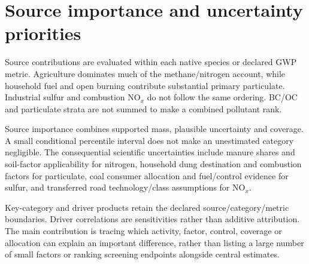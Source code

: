 \section{Source importance and uncertainty priorities}\label{sec:keycat}
Source contributions are evaluated within each native species or declared GWP metric. Agriculture dominates much of the methane/nitrogen account, while household fuel and open burning contribute substantial primary particulate. Industrial sulfur and combustion NO$_x$ do not follow the same ordering. BC/OC and particulate strata are not summed to make a combined pollutant rank.

Source importance combines supported mass, plausible uncertainty and coverage. A small conditional percentile interval does not make an unestimated category negligible. The consequential scientific uncertainties include manure shares and soil-factor applicability for nitrogen, household dung destination and combustion factors for particulate, coal consumer allocation and fuel/control evidence for sulfur, and transferred road technology/class assumptions for NO$_x$.

Key-category and driver products retain the declared source/category/metric boundaries. Driver correlations are sensitivities rather than additive attribution. The main contribution is tracing which activity, factor, control, coverage or allocation can explain an important difference, rather than listing a large number of small factors or ranking screening endpoints alongside central estimates.
